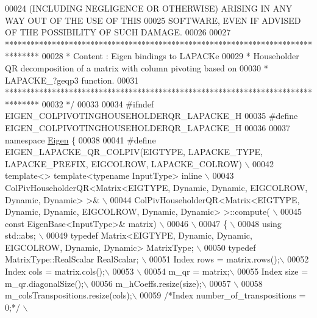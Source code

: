 \begin{DoxyCode}
00024 \textcolor{comment}{ (INCLUDING NEGLIGENCE OR OTHERWISE) ARISING IN ANY WAY OUT OF THE USE OF THIS}
00025 \textcolor{comment}{ SOFTWARE, EVEN IF ADVISED OF THE POSSIBILITY OF SUCH DAMAGE.}
00026 \textcolor{comment}{}
00027 \textcolor{comment}{ ********************************************************************************}
00028 \textcolor{comment}{ *   Content : Eigen bindings to LAPACKe}
00029 \textcolor{comment}{ *    Householder QR decomposition of a matrix with column pivoting based on}
00030 \textcolor{comment}{ *    LAPACKE\_?geqp3 function.}
00031 \textcolor{comment}{ ********************************************************************************}
00032 \textcolor{comment}{*/}
00033 
00034 \textcolor{preprocessor}{#ifndef EIGEN\_COLPIVOTINGHOUSEHOLDERQR\_LAPACKE\_H}
00035 \textcolor{preprocessor}{#define EIGEN\_COLPIVOTINGHOUSEHOLDERQR\_LAPACKE\_H}
00036 
00037 \textcolor{keyword}{namespace }\hyperlink{namespace_eigen}{Eigen} \{ 
00038 
00041 \textcolor{preprocessor}{#define EIGEN\_LAPACKE\_QR\_COLPIV(EIGTYPE, LAPACKE\_TYPE, LAPACKE\_PREFIX, EIGCOLROW, LAPACKE\_COLROW) \(\backslash\)}
00042 \textcolor{preprocessor}{template<> template<typename InputType> inline \(\backslash\)}
00043 \textcolor{preprocessor}{ColPivHouseholderQR<Matrix<EIGTYPE, Dynamic, Dynamic, EIGCOLROW, Dynamic, Dynamic> >& \(\backslash\)}
00044 \textcolor{preprocessor}{ColPivHouseholderQR<Matrix<EIGTYPE, Dynamic, Dynamic, EIGCOLROW, Dynamic, Dynamic> >::compute( \(\backslash\)}
00045 \textcolor{preprocessor}{              const EigenBase<InputType>& matrix) \(\backslash\)}
00046 \textcolor{preprocessor}{\(\backslash\)}
00047 \textcolor{preprocessor}{\{ \(\backslash\)}
00048 \textcolor{preprocessor}{  using std::abs; \(\backslash\)}
00049 \textcolor{preprocessor}{  typedef Matrix<EIGTYPE, Dynamic, Dynamic, EIGCOLROW, Dynamic, Dynamic> MatrixType; \(\backslash\)}
00050 \textcolor{preprocessor}{  typedef MatrixType::RealScalar RealScalar; \(\backslash\)}
00051 \textcolor{preprocessor}{  Index rows = matrix.rows();\(\backslash\)}
00052 \textcolor{preprocessor}{  Index cols = matrix.cols();\(\backslash\)}
00053 \textcolor{preprocessor}{\(\backslash\)}
00054 \textcolor{preprocessor}{  m\_qr = matrix;\(\backslash\)}
00055 \textcolor{preprocessor}{  Index size = m\_qr.diagonalSize();\(\backslash\)}
00056 \textcolor{preprocessor}{  m\_hCoeffs.resize(size);\(\backslash\)}
00057 \textcolor{preprocessor}{\(\backslash\)}
00058 \textcolor{preprocessor}{  m\_colsTranspositions.resize(cols);\(\backslash\)}
00059 \textcolor{preprocessor}{  }\textcolor{comment}{/*Index number\_of\_transpositions = 0;*/}\textcolor{preprocessor}{ \(\backslash\)}

\end{DoxyCode}
